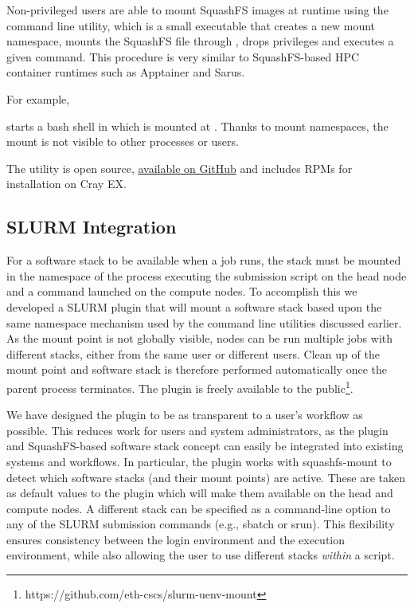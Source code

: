 Non-privileged users are able to mount SquashFS images at runtime using the  command line utility, which is a small  executable that creates a new mount namespace, mounts the SquashFS file through , drops privileges and executes a given command.
This procedure is very similar to SquashFS-based HPC container runtimes such as Apptainer and Sarus.

For example,



starts a bash shell in which  is mounted at .
Thanks to mount namespaces, the mount is not visible to other processes or users.

The utility is open source, \href{https://github.com/eth-cscs/squashfs-mount}{available on GitHub} and includes RPMs for installation on Cray EX.

\subsection{SLURM Integration}


For a software stack to be available when a job runs, the stack must be mounted in the namespace of the process executing the submission script on the head node and a command launched on the compute nodes.
To accomplish this we developed a SLURM plugin that will mount a software stack based upon the same namespace mechanism used by the command line utilities discussed earlier.
As the mount point is not globally visible, nodes can be run multiple jobs with different stacks, either from the same user or different users.
Clean up of the mount point and software stack is therefore performed automatically once the parent process terminates.
The plugin is freely available to the public\footnote{https://github.com/eth-cscs/slurm-uenv-mount}.

We have designed the plugin to be as transparent to a user's workflow as possible.
This reduces work for users and system administrators, as the plugin and SquashFS-based software stack concept can easily be integrated into existing systems and workflows.
In particular, the plugin works with squashfs-mount to detect which software stacks (and their mount points) are active.
These are taken as default values to the plugin which will make them available on the head and compute nodes.
A different stack can be specified as a command-line option to any of the SLURM submission commands (e.g., sbatch or srun).
This flexibility ensures consistency between the login environment and the execution environment, while also allowing the user to use different stacks \emph{within} a script.

